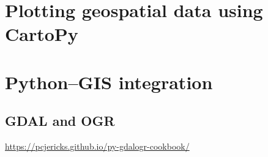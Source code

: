 \documentclass[a4paper,10pt]{scrartcl}
\begin{document}
\section{Plotting geospatial data using CartoPy}

\section{Python--GIS integration}

\subsection{GDAL and OGR}

\url{https://pcjericks.github.io/py-gdalogr-cookbook/}
\end{document}

